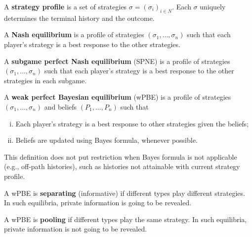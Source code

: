 \documentclass{article}
\begin{document}
   	\begin{definition}
   		A \textbf{strategy profile} is a set of strategies $\sigma = (\sigma_i)_{i \in N}$. Each $\sigma$ uniquely determines the terminal history and the outcome.
   	\end{definition}
   	
   	\begin{definition}
   		A \textbf{Nash equilibrium} is a profile of strategies $\left(\sigma_{1}, \ldots, \sigma_{n}\right)$ such that each player's strategy is a best response to the other strategies.
   	\end{definition}
   	
   	\begin{definition}
   		A \textbf{subgame perfect Nash equilibrium} (SPNE) is a profile of strategies $\left(\sigma_{1}, \ldots, \sigma_{n}\right)$ such that each player's strategy is a best response to the other strategies in each subgame.
   	\end{definition}

   	\begin{definition}
   		A \textbf{weak perfect Bayesian equilibrium} (wPBE) is a profile of strategies $\left(\sigma_{1}, \ldots, \sigma_{n}\right)$ and beliefs $\left(P_1, \ldots, P_n\right)$ such that
   		\begin{enumerate}[(i)]
   			\item Each player's strategy is a best response to other strategies given the beliefs;
   			\item Beliefs are updated using Bayes formula, whenever possible.
   		\end{enumerate}
   	\end{definition}
   	
   	\begin{remark}
   		This definition does not put restriction when Bayes formula is not applicable (e.g., off-path histories), such as histories not attainable with current strategy profile.
   	\end{remark}
   	
   	\begin{definition}
   		A wPBE is \textbf{separating} (informative) if different types play different strategies. In such equilibria, private information is going to be revealed.
   	\end{definition}
   	
   	   	\begin{definition}
   		A wPBE is \textbf{pooling} if different types play the same strategy. In such equilibria, private information is not going to be revealed.
   	\end{definition}
\end{document}
